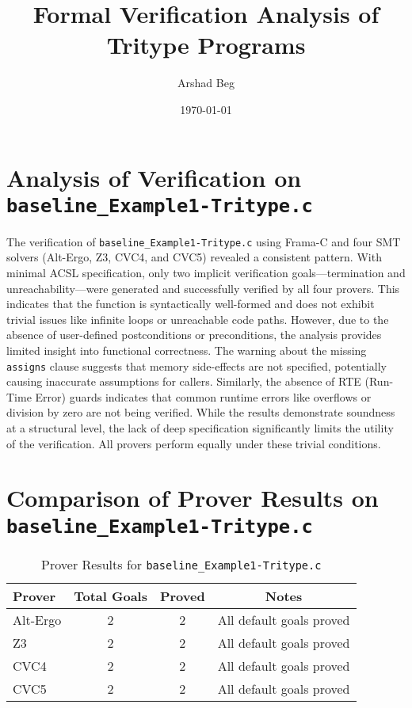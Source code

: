\documentclass[12pt]{article}
\title{Formal Verification Analysis of Tritype Programs}
\author{Arshad Beg}
\date{\today}
\begin{document}
\maketitle

\section*{Analysis of Verification on \texttt{baseline\_Example1-Tritype.c}}

The verification of \texttt{baseline\_Example1-Tritype.c} using Frama-C and four SMT solvers (Alt-Ergo, Z3, CVC4, and CVC5) revealed a consistent pattern. With minimal ACSL specification, only two implicit verification goals—termination and unreachability—were generated and successfully verified by all four provers. This indicates that the function is syntactically well-formed and does not exhibit trivial issues like infinite loops or unreachable code paths. However, due to the absence of user-defined postconditions or preconditions, the analysis provides limited insight into functional correctness. The warning about the missing \texttt{assigns} clause suggests that memory side-effects are not specified, potentially causing inaccurate assumptions for callers. Similarly, the absence of RTE (Run-Time Error) guards indicates that common runtime errors like overflows or division by zero are not being verified. While the results demonstrate soundness at a structural level, the lack of deep specification significantly limits the utility of the verification. All provers perform equally under these trivial conditions.

\section*{Comparison of Prover Results on \texttt{baseline\_Example1-Tritype.c}}

\begin{table}[h]
\centering
\caption{Prover Results for \texttt{baseline\_Example1-Tritype.c}}
\begin{tabular}{@{}lccc@{}}
\toprule
\textbf{Prover} & \textbf{Total Goals} & \textbf{Proved} & \textbf{Notes} \\ \midrule
Alt-Ergo & 2 & 2 & All default goals proved \\
Z3       & 2 & 2 & All default goals proved \\
CVC4     & 2 & 2 & All default goals proved \\
CVC5     & 2 & 2 & All default goals proved \\
\bottomrule
\end{tabular}
\end{table}
\end{document}
